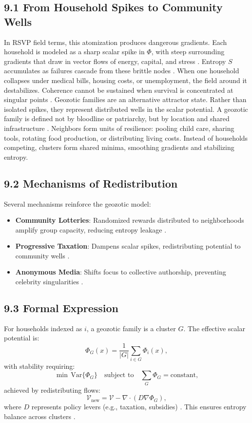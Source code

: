 \documentclass[12pt]{article}
\begin{document}
\subsection*{9.1 From Household Spikes to Community Wells}
In RSVP field terms, this atomization produces dangerous gradients. Each household is modeled as a sharp scalar spike in \(\Phi\), with steep surrounding gradients that draw in vector flows of energy, capital, and stress \citep{gromov1999}. Entropy \(S\) accumulates as failures cascade from these brittle nodes \citep{shannon1948}. When one household collapses under medical bills, housing costs, or unemployment, the field around it destabilizes. Coherence cannot be sustained when survival is concentrated at singular points \citep{jaynes2003}.
Geozotic families are an alternative attractor state. Rather than isolated spikes, they represent distributed wells in the scalar potential. A geozotic family is defined not by bloodline or patriarchy, but by location and shared infrastructure \citep{deleuze1987}. Neighbors form units of resilience: pooling child care, sharing tools, rotating food production, or distributing living costs. Instead of households competing, clusters form shared minima, smoothing gradients and stabilizing entropy.
\subsection*{9.2 Mechanisms of Redistribution}
Several mechanisms reinforce the geozotic model:
\begin{itemize}
    \item \textbf{Community Lotteries}: Randomized rewards distributed to neighborhoods amplify group capacity, reducing entropy leakage \citep{hanson2003}.
    \item \textbf{Progressive Taxation}: Dampens scalar spikes, redistributing potential to community wells \citep{zuboff2019}.
    \item \textbf{Anonymous Media}: Shifts focus to collective authorship, preventing celebrity singularities \citep{lanier2018}.
\end{itemize}
\subsection*{9.3 Formal Expression}
For households indexed as \(i\), a geozotic family is a cluster \(G\). The effective scalar potential is:
\[
\Phi_G(x) = \frac{1}{|G|} \sum_{i \in G} \Phi_i(x),
\]
with stability requiring:
\[
\min \, \mathrm{Var}\{\Phi_G\} \quad \text{subject to} \quad \sum_G \Phi_G = \text{constant},
\]
achieved by redistributing flows:
\[
\mathcal{V}_{\text{new}} = \mathcal{V} - \nabla \cdot (D \nabla \Phi_G),
\]
where \(D\) represents policy levers (e.g., taxation, subsidies) \citep{gromov1999}. This ensures entropy balance across clusters \citep{cover2006}.
\end{document}
